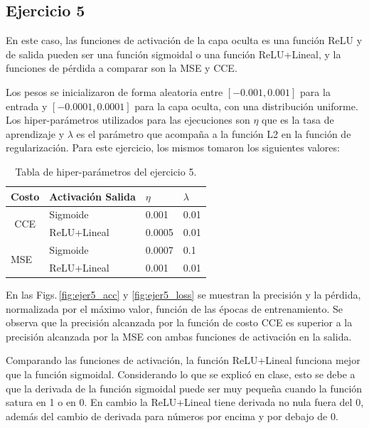\subsection*{Ejercicio 5}

En este caso, las funciones de activación de la capa oculta es una  función ReLU y de salida pueden ser una función sigmoidal o una función ReLU+Lineal, y la funciones de pérdida a comparar son la MSE y CCE. 

Los pesos se inicializaron de forma aleatoria entre $[-0.001, 0.001]$ para la entrada y $[-0.0001, 0.0001]$ para la capa oculta,  con una distribución uniforme. Los hiper-parámetros utilizados para las ejecuciones son $\eta$ que es la tasa de aprendizaje y $\lambda$ es el parámetro que acompaña a la función L2 en la función de regularización. Para este ejercicio, los mismos tomaron los siguientes valores:

\begin{table}[H]
    \centering
    \begin{tabular}{|l|l|l|l|l|}
    \hline
    \multicolumn{2}{|l|}{Costo}                & Activación Salida & $\eta$ & $\lambda$ \\ \hline
    \multicolumn{2}{|c|}{\multirow{2}{*}{CCE}} & Sigmoide          & 0.001  & 0.01      \\ \cline{3-5} 
    \multicolumn{2}{|c|}{}                     & ReLU+Lineal       & 0.0005 & 0.01      \\ \hline
    \multicolumn{2}{|l|}{\multirow{2}{*}{MSE}} & Sigmoide          & 0.0007 & 0.1       \\ \cline{3-5} 
    \multicolumn{2}{|l|}{}                     & ReLU+Lineal       & 0.001  & 0.01      \\ \hline
    \end{tabular}
    \caption{Tabla de hiper-parámetros del ejercicio 5.}
\end{table}


En las Figs.\,\ref{fig:ejer5_acc} y \ref{fig:ejer5_loss} se muestran la precisión y la pérdida, normalizada por el máximo valor, función de las épocas de entrenamiento.  Se observa que la precisión alcanzada por la función de costo CCE es superior a la precisión alcanzada por la MSE con ambas funciones de activación en la salida. 

Comparando las funciones de activación, la función ReLU+Lineal funciona mejor que la función sigmoidal. Considerando lo que se explicó en clase, esto se debe a que la derivada de la función sigmoidal puede ser muy pequeña cuando la función satura en 1 o en 0. En cambio la ReLU+Lineal tiene derivada no nula fuera del 0, además del cambio de derivada para números por encima y por debajo de 0.

